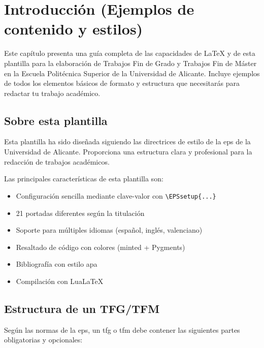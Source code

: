 \chapter{Introducción (Ejemplos de contenido y estilos)}
\label{ch:introduccion}

Este capítulo presenta una guía completa de las capacidades de \LaTeX{} y de esta
plantilla para la elaboración de Trabajos Fin de Grado y Trabajos Fin de Máster
en la Escuela Politécnica Superior de la Universidad de Alicante. Incluye ejemplos
de todos los elementos básicos de formato y estructura que necesitarás para
redactar tu trabajo académico.

\section{Sobre esta plantilla}
\label{sec:sobre-plantilla}

Esta plantilla ha sido diseñada siguiendo las directrices de estilo de la \gls{eps} de la Universidad de Alicante. Proporciona una estructura clara y profesional para la redacción de trabajos académicos.

Las principales características de esta plantilla son:

\begin{itemize}
  \item Configuración sencilla mediante clave-valor con \verb|\EPSsetup{...}|
  \item 21 portadas diferentes según la titulación
  \item Soporte para múltiples idiomas (español, inglés, valenciano)
  \item Resaltado de código con colores (minted + Pygments)
  \item Bibliografía con estilo \gls{apa}
  \item Compilación con LuaLaTeX
\end{itemize}

\section{Estructura de un TFG/TFM}
\label{sec:estructura-tfg}

Según las normas de la \gls{eps}, un \gls{tfg} o \gls{tfm} debe contener
las siguientes partes obligatorias y opcionales:

